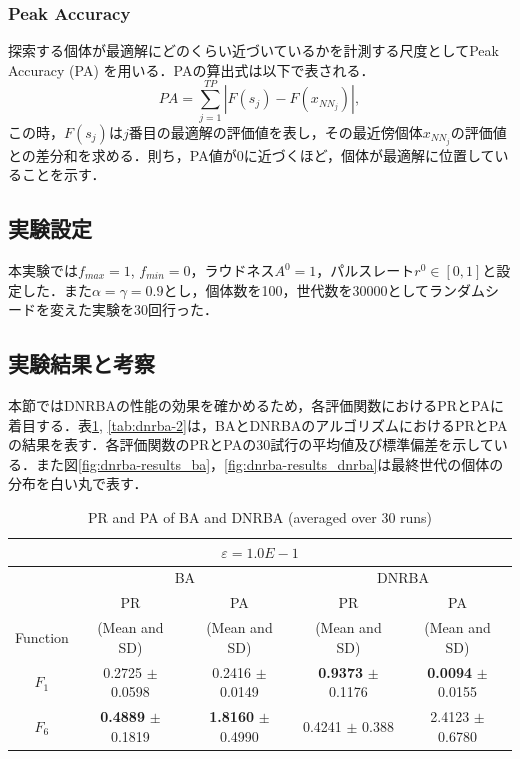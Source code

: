 \documentclass[a4j,11pt]{jarticle}
\begin{document}
\subsubsection{Peak Accuracy}
探索する個体が最適解にどのくらい近づいているかを計測する尺度としてPeak Accuracy (PA) \cite{CEC2013} を用いる．PAの算出式は以下で表される．
\begin{equation}
PA=\sum_{j=1}^{TP}|F(s_j)-F(x_{NN_j})|,
\end{equation}
この時，$F(s_j)$は$j$番目の最適解の評価値を表し，その最近傍個体$x_{NN_j}$の評価値との差分和を求める．則ち，PA値が0に近づくほど，個体が最適解に位置していることを示す．

\FloatBarrier
\subsection{実験設定}
本実験では$f_{max}=1$, $f_{min}=0$，ラウドネス$A^0=1$，パルスレート$r^0 \in [0,1]$と設定した．また$\alpha= \gamma = 0.9$とし，個体数を100，世代数を30000としてランダムシードを変えた実験を30回行った．

\subsection{実験結果と考察}
\label{sss:DNRBA-results}
本節ではDNRBAの性能の効果を確かめるため，各評価関数におけるPRとPAに着目する．表\ref{tab:dnrba-1}, \ref{tab:dnrba-2}は，BAとDNRBAのアルゴリズムにおけるPRとPAの結果を表す．各評価関数のPRとPAの30試行の平均値及び標準偏差を示している．また図\ref{fig:dnrba-results_ba}，\ref{fig:dnrba-results_dnrba}は最終世代の個体の分布を白い丸で表す．

\begin{table}[h]
\caption{PR and PA of BA and DNRBA (averaged over 30 runs)}
\begin{center}
\begin{tabular}{c|c|c|c|c}
\multicolumn{5}{c}{$\varepsilon = 1.0E-1$} \\
\hline
\multicolumn{1}{c|}{} & \multicolumn{2}{c|}{BA} & \multicolumn{2}{c}{DNRBA} \\
\hline
 & PR & PA & PR & PA \\

Function & (Mean and SD) & (Mean and SD) & (Mean and SD) & (Mean and SD) \\
\hline
$F_1 $ & 0.2725 $\pm$ 0.0598 & 0.2416 $\pm$ 0.0149 & {\bf 0.9373} $\pm$ 0.1176  & {\bf 0.0094} $\pm$ 0.0155  \\
\hline
$F_6 $ & {\bf 0.4889} $\pm$ 0.1819 & {\bf 1.8160} $\pm$ 0.4990 & 0.4241 $\pm$ 0.388 & 2.4123 $\pm$ 0.6780 \\
\hline

\end{tabular}
\label{tab:dnrba-1}
\end{center}
\end{table}
\end{document}
